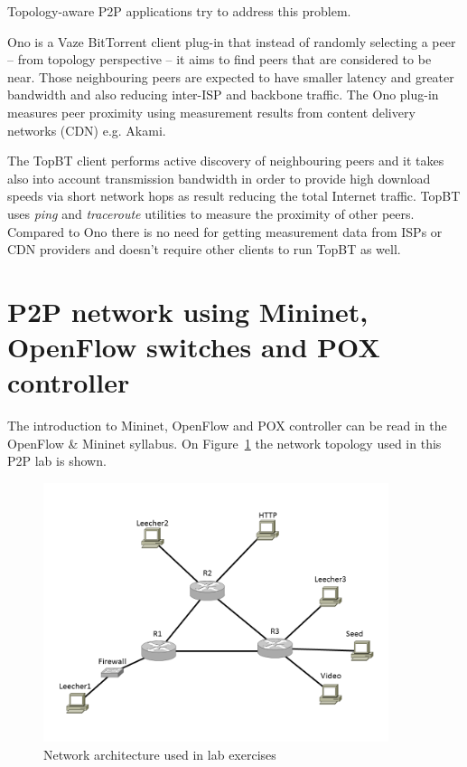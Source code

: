 \documentclass[a4paper]{article}
\begin{document}
Topology-aware P2P applications try to address this problem.

Ono is a Vaze BitTorrent client plug-in that instead of randomly selecting a peer -- from topology perspective -- it
aims to find peers that are considered to be near. Those neighbouring peers are expected to have smaller latency and
greater bandwidth and also reducing inter-ISP and backbone traffic. The Ono plug-in measures peer proximity using
measurement results from content delivery networks (CDN) e.g. Akami.

The TopBT client performs active discovery of neighbouring peers and it takes also into account transmission bandwidth
in order to provide high download speeds via short network hops as result reducing the total Internet traffic. TopBT
uses \emph{ping} and \emph{traceroute} utilities to measure the proximity of other peers. Compared to Ono there is no
need for getting measurement data from ISPs or CDN providers and doesn't require other clients to run TopBT as well.

\section{P2P network using Mininet, OpenFlow switches and POX controller}

The introduction to Mininet, OpenFlow and POX controller can be read in the OpenFlow \& Mininet syllabus. On
Figure~\ref{fig:Lab-topo} the network topology used in this P2P lab is shown.

\begin{figure}[H]
    \centering
    \includegraphics[width=0.9\textwidth]{figures/halozat.png}
    \caption{Network architecture used in lab exercises}
    \label{fig:Lab-topo}
\end{figure}
\end{document}
